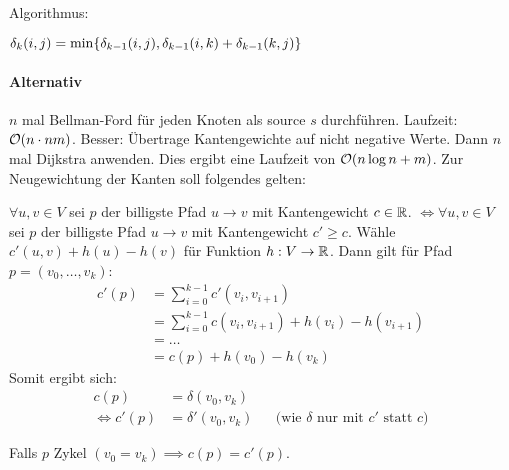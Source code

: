             Algorithmus:
            \begin{algorithmic}
            			\State $\delta_k(i,j) = \min\{\delta_{k-1}(i,j), \delta_{k-1}(i, k) + \delta_{k-1}(k, j)\}$
            		\EndFor
            	\EndFor
            \end{algorithmic}


            \paragraph{Alternativ}
            $n$ mal Bellman-Ford für jeden Knoten als source $s$ durchführen.
            Laufzeit: $\mathcal{O}(n \cdot n m)$.
            Besser: Übertrage Kantengewichte auf nicht negative Werte. Dann $n$ mal Dijkstra anwenden.
            Dies ergibt eine Laufzeit von $\mathcal{O}(n \log n + m)$. Zur Neugewichtung der Kanten soll folgendes gelten:
            \begin{lemma}
                $\forall u, v \in V$ sei $p$ der billigste Pfad $u \to v$ mit Kantengewicht $c \in \mathbb{R}$.
                $\iff \forall u, v \in V$ sei $p$ der billigste Pfad $u \to v$ mit Kantengewicht  $c' \ge c$. Wähle $c'(u, v) + h(u) - h(v)$ für Funktion $h: V \to \mathbb{R}$.
                Dann gilt für Pfad $p = (v_0, \dots, v_k)$:
                \begin{align*}
                    c'(p) &= \sum_{i=0}^{k-1} c'(v_i, v_{i+1}) \\
                          &= \sum_{i=0}^{k-1} c(v_i, v_{i+1}) + h(v_i) - h(v_{i+1}) \\
                          &= \dots \\
                          &= c(p) + h(v_0) - h(v_k)
                \end{align*}
                Somit ergibt sich:
                \begin{align*}
                    c(p) &= \delta(v_0, v_k) \\
                    \iff c'(p) &= \delta'(v_0, v_k) &&\text{(wie $\delta$ nur mit $c'$ statt $c$)}
                \end{align*}
            \end{lemma}
            Falls $p$ Zykel $(v_0 = v_k) \implies c(p) = c'(p)$.

